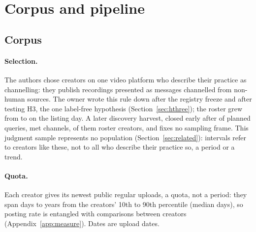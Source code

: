 
\section{Corpus and pipeline}
\label{sec:data}

\subsection{Corpus}

\paragraph{Selection.} The authors chose \NCreators{} creators on one video platform who describe their practice as
channelling: they publish recordings presented as messages channelled from non-human sources. The owner wrote this rule down after the
registry freeze and after testing H3, the one label-free hypothesis (Section~\ref{sec:hthree}); the roster grew from
\RosterFirst{} to \NCreators{} on the listing day. A later discovery harvest, closed early after \HarvestQueries{} of
\HarvestTerms{} planned queries, met \HarvestChannels{} channels, \HarvestCohortFound{} of them roster creators, and
fixes no sampling frame. This judgment sample represents no population (Section~\ref{sec:related}): intervals refer
to creators like these, not to all who describe their practice so, a period or a trend.

\paragraph{Quota.} Each creator gives its newest \NPerCreator{} public regular uploads, a quota, not a period: they span
\SpanPtenDays{} days to \SpanPninetyYears{} years from the creators' 10th to 90th percentile (median \SpanMedDays{}
days), so posting rate is entangled with comparisons between creators (Appendix~\ref{app:measure}). Dates are upload
dates.

